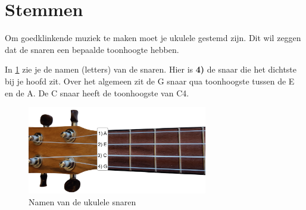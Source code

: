 \section{Stemmen}

Om goedklinkende muziek te maken moet je ukulele gestemd zijn. Dit wil zeggen dat de snaren een bepaalde toonhoogte hebben.

In \ref{fig:ukulele_string_names} zie je de namen (letters) van de snaren. Hier is \textbf{4)} de snaar die het dichtste bij je hoofd zit. Over het algemeen zit de G snaar qua toonhoogste tussen de E en de A. De C snaar heeft de toonhoogste van C4. 

\begin{figure}[h]
    \centering
    \includegraphics[width=0.7\textwidth]{../Images/UkuleleNeck-StringNames.png}
    \caption{Namen van de ukulele snaren}
    \label{fig:ukulele_string_names}
\end{figure}

